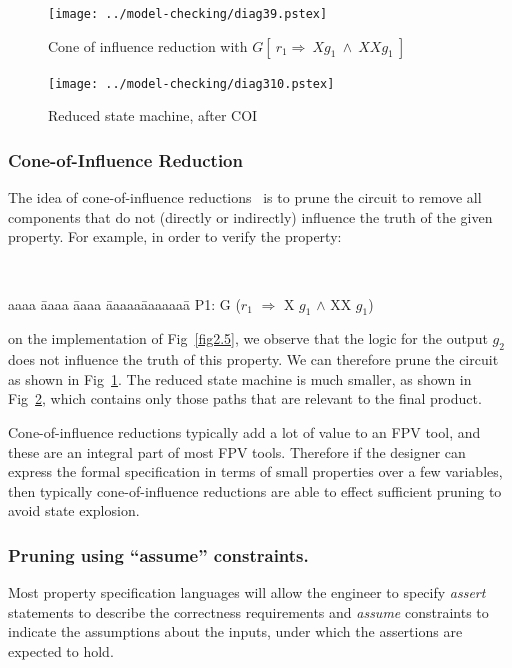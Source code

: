 \begin{figure}[htb]
\centering
\texttt{[image: ../model-checking/diag39.pstex]}
\center
\caption{Cone of influence reduction with
    $G[\ r_1 \Rightarrow\  Xg_1\ \land\  XXg_1\ ]$} \label{fig2.8}
\end{figure}

\begin{figure}[htb]
\centering
\texttt{[image: ../model-checking/diag310.pstex]}
\center
\caption{Reduced state machine, after COI} \label{fig2.9}
\end{figure}

\subsubsection{Cone-of-Influence Reduction}
The idea of cone-of-influence reductions~\cite{clarke:00} is to prune the 
circuit to remove all components that do not (directly or indirectly) 
influence the truth of the given property. 
For example, in order to verify the property:
{\tt
\begin{tabbing}
aaaa \= aaaa \= aaaa \= aaaaa\= aaaaaaa\= \kill
\>\>\>\> P1: \> G ($r_1$ $\Rightarrow$  X $g_1$ $\land$  XX $g_1$)
\end{tabbing}
}
\noindent
    on the implementation of Fig~\ref{fig2.5}, we observe that the
    logic for the output $g_2$ does not influence the truth of this
    property. We can therefore prune the circuit as shown in
    Fig~\ref{fig2.8}. The reduced state machine is much smaller,
    as shown in Fig~\ref{fig2.9}, which contains only those paths that
    are relevant to the final product. 

	\noindent
    Cone-of-influence reductions typically add a lot of value to an FPV
    tool, and these are an integral part of most FPV tools. Therefore if
    the designer can express the formal specification in terms of small
    properties over a few variables, then typically cone-of-influence
    reductions are able to effect sufficient pruning to avoid state
    explosion.

\subsubsection{Pruning using ``assume'' constraints.}
    Most property specification
    languages will allow the engineer to specify {\em assert} statements
    to describe the correctness requirements and {\em assume} constraints
    to indicate the assumptions about the inputs, under which the
    assertions are expected to hold.

